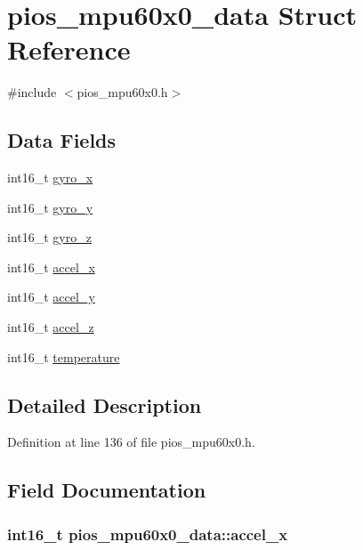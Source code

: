 \hypertarget{structpios__mpu60x0__data}{\section{pios\-\_\-mpu60x0\-\_\-data \-Struct \-Reference}
\label{structpios__mpu60x0__data}
}


{\ttfamily \#include $<$pios\-\_\-mpu60x0.\-h$>$}

\subsection*{\-Data \-Fields}
\begin{DoxyCompactItemize}
\item 
int16\-\_\-t \hyperlink{structpios__mpu60x0__data_a6369d6fde9747bdd53c2dda900377b0c}{gyro\-\_\-x}
\item 
int16\-\_\-t \hyperlink{structpios__mpu60x0__data_afdb7be8323e08a88d0e6c4909a868ad4}{gyro\-\_\-y}
\item 
int16\-\_\-t \hyperlink{structpios__mpu60x0__data_a526ba51edf822da11f9a97d1eef8c1e3}{gyro\-\_\-z}
\item 
int16\-\_\-t \hyperlink{structpios__mpu60x0__data_a5a5f295bda1bd7d7a3d00d02034a49e8}{accel\-\_\-x}
\item 
int16\-\_\-t \hyperlink{structpios__mpu60x0__data_a730c9c5aff6db5ecad97a13fba4da981}{accel\-\_\-y}
\item 
int16\-\_\-t \hyperlink{structpios__mpu60x0__data_a20c00b7ce03653dd56fc9bfe364eac75}{accel\-\_\-z}
\item 
int16\-\_\-t \hyperlink{structpios__mpu60x0__data_a799b825b01a55b144c922827bb39d5e1}{temperature}
\end{DoxyCompactItemize}


\subsection{\-Detailed \-Description}


\-Definition at line 136 of file pios\-\_\-mpu60x0.\-h.



\subsection{\-Field \-Documentation}
\hypertarget{structpios__mpu60x0__data_a5a5f295bda1bd7d7a3d00d02034a49e8}{
\subsubsection[{accel\-\_\-x}]{\setlength{\rightskip}{0pt plus 5cm}int16\-\_\-t {\bf pios\-\_\-mpu60x0\-\_\-data\-::accel\-\_\-x}}}\label{structpios__mpu60x0__data_a5a5f295bda1bd7d7a3d00d02034a49e8}


